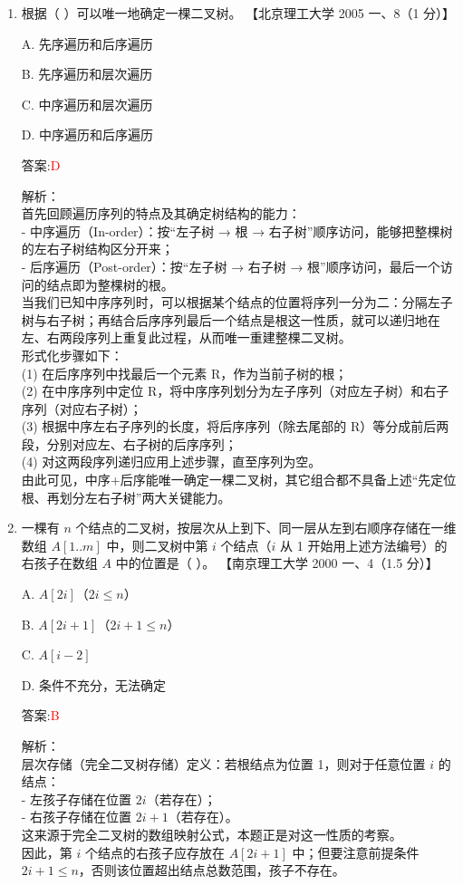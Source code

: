 \documentclass[lang=cn,newtx,10pt,scheme=chinese]{../../../elegantbook}
\begin{document}
\begin{enumerate}
    \item 根据（ ）可以唯一地确定一棵二叉树。  
    【北京理工大学 2005 一、8（1 分）】

    A. 先序遍历和后序遍历

    B. 先序遍历和层次遍历

    C. 中序遍历和层次遍历

    D. 中序遍历和后序遍历

    答案:\textcolor{red}{D}

    解析：\\
    首先回顾遍历序列的特点及其确定树结构的能力：\\
    - 中序遍历（In-order）：按“左子树 → 根 → 右子树”顺序访问，能够把整棵树的左右子树结构区分开来；\\
    - 后序遍历（Post-order）：按“左子树 → 右子树 → 根”顺序访问，最后一个访问的结点即为整棵树的根。\\
    当我们已知中序序列时，可以根据某个结点的位置将序列一分为二：分隔左子树与右子树；再结合后序序列最后一个结点是根这一性质，就可以递归地在左、右两段序列上重复此过程，从而唯一重建整棵二叉树。\\
    形式化步骤如下：\\
    (1) 在后序序列中找最后一个元素 R，作为当前子树的根；\\
    (2) 在中序序列中定位 R，将中序序列划分为左子序列（对应左子树）和右子序列（对应右子树）；\\
    (3) 根据中序左右子序列的长度，将后序序列（除去尾部的 R）等分成前后两段，分别对应左、右子树的后序序列；\\
    (4) 对这两段序列递归应用上述步骤，直至序列为空。\\
    由此可见，中序+后序能唯一确定一棵二叉树，其它组合都不具备上述“先定位根、再划分左右子树”两大关键能力。\\

\item 一棵有 $n$ 个结点的二叉树，按层次从上到下、同一层从左到右顺序存储在一维数组 $A[1..m]$ 中，则二叉树中第 $i$ 个结点（$i$ 从 1 开始用上述方法编号）的右孩子在数组 $A$ 中的位置是（ ）。  
    【南京理工大学 2000 一、4（1.5 分）】

    A. $A[2i]$（$2i ≤ n$）

    B. $A[2i+1]$（$2i+1 ≤ n$）

    C. $A[i-2]$

    D. 条件不充分，无法确定

    答案:\textcolor{red}{B}

    解析：\\
    层次存储（完全二叉树存储）定义：若根结点为位置 1，则对于任意位置 $i$ 的结点：\\
    - 左孩子存储在位置 $2i$（若存在）；\\
    - 右孩子存储在位置 $2i+1$（若存在）。\\
    这来源于完全二叉树的数组映射公式，本题正是对这一性质的考察。\\
    因此，第 $i$ 个结点的右孩子应存放在 $A[2i+1]$ 中；但要注意前提条件 $2i+1 \le n$，否则该位置超出结点总数范围，孩子不存在。\\


\end{enumerate}
\end{document}
